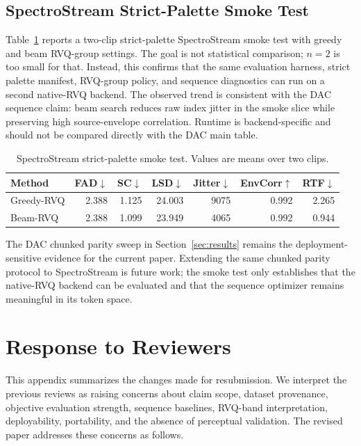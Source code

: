 \documentclass[twoside,a4paper]{article}
\begin{document}
\subsection{SpectroStream Strict-Palette Smoke Test}

Table~\ref{tab:port-spectro-smoke} reports a two-clip strict-palette SpectroStream smoke test with greedy and beam RVQ-group settings. The goal is not statistical comparison; $n=2$ is too small for that. Instead, this confirms that the same evaluation harness, strict palette manifest, RVQ-group policy, and sequence diagnostics can run on a second native-RVQ backend. The observed trend is consistent with the DAC sequence claim: beam search reduces raw index jitter in the smoke slice while preserving high source-envelope correlation. Runtime is backend-specific and should not be compared directly with the DAC main table.

\begin{table}[!t]
    \centering
    \scriptsize
    \setlength{\tabcolsep}{2.2pt}
    \caption{SpectroStream strict-palette smoke test. Values are means over two clips.}
    \label{tab:port-spectro-smoke}
    \begin{tabular}{lrrrrrr}
    \toprule
    Method & FAD$\downarrow$ & SC$\downarrow$ & LSD$\downarrow$ & Jitter$\downarrow$ & EnvCorr$\uparrow$ & RTF$\downarrow$ \\
    \midrule
    Greedy-RVQ & 2.388 & 1.125 & 24.003 & 9075 & 0.992 & 2.265 \\
    Beam-RVQ & 2.388 & 1.099 & 23.949 & 4065 & 0.992 & 0.944 \\
    \bottomrule
    \end{tabular}
\end{table}

The DAC chunked parity sweep in Section~\ref{sec:results} remains the deployment-sensitive evidence for the current paper. Extending the same chunked parity protocol to SpectroStream is future work; the smoke test only establishes that the native-RVQ backend can be evaluated and that the sequence optimizer remains meaningful in its token space.

\section{Response to Reviewers}\label{sec:app-review-response}

This appendix summarizes the changes made for resubmission. We interpret the previous reviews as raising concerns about claim scope, dataset provenance, objective evaluation strength, sequence baselines, RVQ-band interpretation, deployability, portability, and the absence of perceptual validation. The revised paper addresses these concerns as follows.
\end{document}
